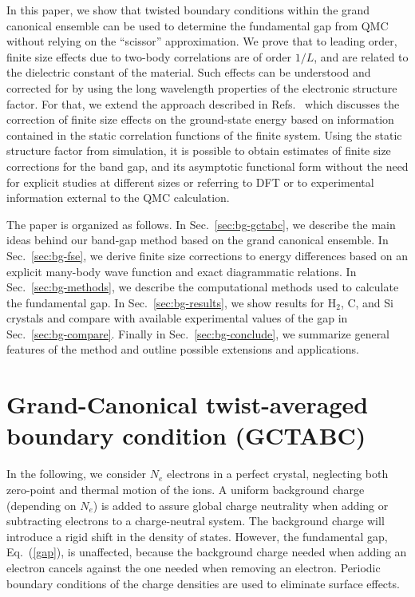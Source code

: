 In this paper, we show that twisted boundary conditions within the grand canonical ensemble
can be used
to  determine the fundamental gap from QMC without relying on the ``scissor'' approximation.
We prove that to leading order, finite size effects due to two-body correlations are of order $1/L$,
and are related to the dielectric constant of the material. Such effects
can be understood and corrected for by using
the long wavelength properties of the electronic
structure factor. 
For that, we extend the approach described in Refs.~\cite{fse,finitesize} 
which discusses the correction
of finite size effects on the ground-state energy
based on information contained in the static correlation functions of the finite system.
Using the static structure factor from simulation, it is possible to obtain estimates of finite size corrections 
for the band gap, and its asymptotic functional form 
without the need for
explicit studies at different sizes or referring to DFT or to experimental information
external to the QMC calculation.

The paper is organized as follows. In Sec.~\ref{sec:bg-gctabc}, we describe the main ideas behind our band-gap method based on the grand canonical ensemble. In Sec.~\ref{sec:bg-fse}, we derive finite size corrections to energy differences based on an explicit many-body wave function and exact diagrammatic relations. In Sec.~\ref{sec:bg-methods}, we describe the computational methods used to calculate the fundamental gap. In Sec.~\ref{sec:bg-results}, we show results for H$_2$, C, and Si crystals
and compare with available experimental values of the gap in Sec.~\ref{sec:bg-compare}.
Finally in Sec.~\ref{sec:bg-conclude}, we summarize general features of the method
 and outline possible extensions and applications.

\section{Grand-Canonical twist-averaged boundary condition (GCTABC)\label{sec:bg-gctabc}}

In the following, we consider $N_e$ electrons in a perfect crystal,
neglecting both zero-point and thermal motion of the ions.
A uniform background charge (depending on $N_e$) is added to assure global 
charge neutrality when adding or subtracting electrons to a charge-neutral system.
The background charge will introduce a rigid shift in the density of states. However, the fundamental gap, Eq.~(\ref{gap}), is unaffected,
because the background
charge needed when adding an electron cancels against the one needed when removing an electron.
Periodic boundary conditions of the charge densities are used to eliminate surface effects.

